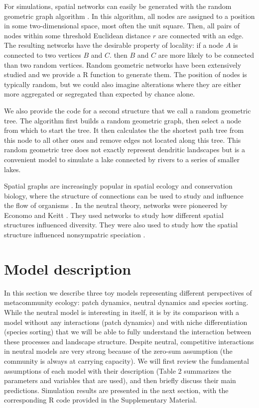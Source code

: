 \documentclass[12pt]{article}
\begin{document}
For simulations, spatial networks can easily be generated with the random
geometric graph algorithm \parencite{sed01}. In this algorithm, all nodes are
assigned to a position in some two-dimensional space, most often the unit
square. Then, all pairs of nodes within some threshold Euclidean distance $r$
are connected with an edge. The resulting networks have the desirable property
of locality: if a node $A$ is connected to two vertices $B$ and $C$. then $B$
and $C$ are more likely to be connected than two random vertices. Random
geometric networks have been extensively studied \parencite{app97a, app97b,
app02a, app02b, pen03} and we provide a R function to generate them. The
position of nodes is typically random, but we could also imagine alterations
where they are either more aggregated or segregated than expected by chance
alone.

We also provide the code for a second structure that we call a random geometric
tree. The algorithm first builds a random geometric graph, then select a node
from which to start the tree. It then calculates the the shortest path tree
\parencite{dij59} from this node to all other ones and remove edges not located
along this tree. This random geometric tree does not exactly represent dendritic
landscapes but is a convenient model to simulate a lake connected by rivers to a
series of smaller lakes.

Spatial graphs are increasingly popular in spatial ecology and conservation
biology, where the structure of connections can be used to study and influence
the flow of organisms \parencite{min07,fal07,min08,gar08,urb09,dal10}. In the
neutral theory, networks were pioneered by Economo and Keitt
\parencite{Economo2008, eco10}. They used networks to study how different
spatial structures influenced diversity. They were also used to study how the
spatial structure influenced nonsympatric speciation
\parencite{Desjardins2012a,Desjardins2012b}.

\section*{Model description}

In this section we describe three toy models representing different
perspectives of metacommunity ecology: patch dynamics, neutral dynamics and
species sorting. While the neutral model is interesting in itself, it is by its
comparison with a model without any interactions (patch dynamics) and with niche
differentiation (species sorting) that we will be able to fully understand the
interaction between these processes and landscape structure. Despite neutral,
competitive interactions in neutral models are very strong because of the
zero-sum assumption (the community is always at carrying capacity). We will
first review the fundamental assumptions of each model with their description
(Table 2 summarizes the parameters and variables that are used), and then
briefly discuss their main predictions. Simulation results are presented in the
next section, with the corresponding R code provided in the Supplementary
Material.
\end{document}
